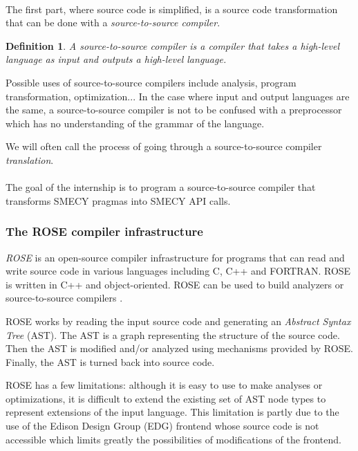 \documentclass[a4paper]{article}
\newtheorem{defdef}{Definition}
\begin{document}
	\paragraph{} The first part, where source code is simplified, is a source code transformation that can be done with a \emph{source-to-source compiler}.

	\begin{defdef}A \emph{source-to-source compiler} is a compiler that takes a high-level language as input and outputs a high-level language.
	\end{defdef}
	
	Possible uses of source-to-source compilers include analysis, program transformation, optimization... In the case where input and output languages are the same, a source-to-source compiler is not to be confused with a preprocessor which has no understanding of the grammar of the language.
	
	We will often call the process of going through a source-to-source compiler \emph{translation}.
	
	\paragraph{}\label{program}The goal of the internship is to program a source-to-source compiler that transforms SMECY pragmas into SMECY API calls.
	

	\subsubsection{The ROSE compiler infrastructure}
	\emph{ROSE} is an open-source compiler infrastructure for programs that can read and write source code in various languages including C, C++ and FORTRAN. ROSE is written in C++ and object-oriented. ROSE can be used to build analyzers or source-to-source compilers \cite{usermanual, tuto}.
	
	ROSE works by reading the input source code and generating an \emph{Abstract Syntax Tree} (AST). The AST is a graph representing the structure of the source code. Then the AST is modified and/or analyzed using mechanisms provided by ROSE. Finally, the AST is turned back into source code.
	
	ROSE has a few limitations: although it is easy to use to make analyses or optimizations, it is difficult to extend the existing set of AST node types to represent extensions of the input language. This limitation is partly due to the use of the Edison Design Group (EDG) frontend whose source code is not accessible which limits greatly the possibilities of modifications of the frontend.
	
\end{document}
